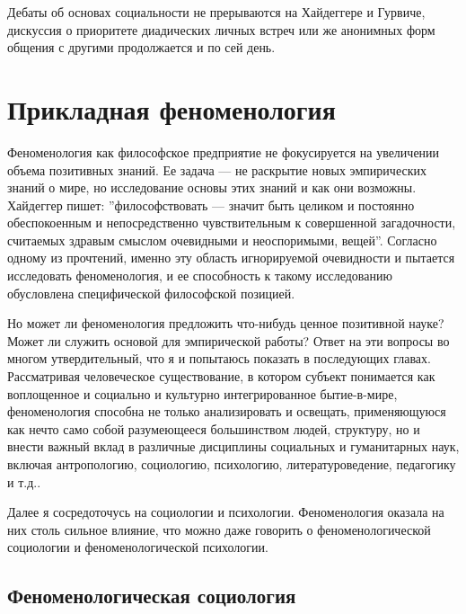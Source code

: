 \documentclass[11pt]{book}
\begin{document}
Дебаты об основах социальности не прерываются на Хайдеггере и Гурвиче, дискуссия о приоритете диадических личных встреч или же анонимных форм общения с другими продолжается и по сей день.

\part{Прикладная феноменология}

Феноменология как философское предприятие не фокусируется на увеличении объема позитивных знаний. Ее задача --- не раскрытие новых эмпирических знаний о мире, но исследование основы этих знаний и как они возможны. Хайдеггер пишет: ''философствовать --- значит быть целиком и постоянно обеспокоенным и непосредственно чувствительным к совершенной загадочности, считаемых здравым смыслом очевидными и неоспоримыми, вещей''. Согласно одному из прочтений, именно эту область игнорируемой очевидности и пытается исследовать феноменология, и ее способность к такому исследованию обусловлена специфической философской позицией.

Но может ли феноменология предложить что-нибудь ценное позитивной науке? Может ли служить основой для эмпирической работы? Ответ на эти вопросы во многом утвердительный, что я и попытаюсь показать в последующих главах. Рассматривая человеческое существование, в котором субъект понимается как воплощенное и социально и культурно интегрированное бытие-в-мире, феноменология способна не только анализировать и освещать, применяющуюся как нечто само собой разумеющееся большинством людей, структуру, но и внести важный вклад в различные дисциплины социальных и гуманитарных наук, включая антропологию, социологию, психологию, литературоведение, педагогику и т.д..

Далее я сосредоточусь на социологии и психологии. Феноменология оказала на них столь сильное влияние, что можно даже говорить о феноменологической социологии и феноменологической психологии.

\chapter{Феноменологическая социология}
\end{document}

